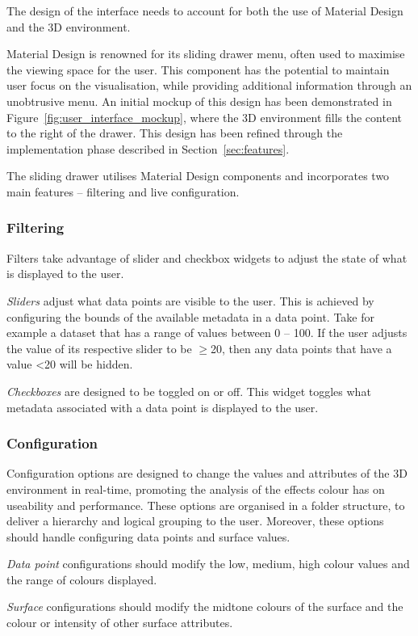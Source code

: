 {{		The design of the interface needs to account for both the use of Material Design and the 3D environment. 

		Material Design is renowned for its sliding drawer menu, often used to maximise the viewing space for the user. This component has the potential to maintain user focus on the visualisation, while providing additional information through an unobtrusive menu. An initial mockup of this design has been demonstrated in Figure~\ref{fig:user_interface_mockup}, where the 3D environment fills the content to the right of the drawer. This design has been refined through the implementation phase described in Section~\ref{sec:features}.


		

		The sliding drawer utilises Material Design components and incorporates two main features -- filtering and live configuration.

		\subsubsection{Filtering} {
		\label{sec:filtering}

			Filters take advantage of slider and checkbox widgets to adjust the state of what is displayed to the user.

			\emph{Sliders} adjust what data points are visible to the user. This is achieved by configuring the bounds of the available metadata in a data point. Take for example a dataset that has a range of values between 0 -- 100. If the user adjusts the value of its respective slider to be $\ge$20, then any data points that have a value \textless20 will be hidden.
			
			\emph{Checkboxes} are designed to be toggled on or off. This widget toggles what metadata associated with a data point is displayed to the user.

		}

		\subsubsection{Configuration} {
		\label{sec:configuration}

			Configuration options are designed to change the values and attributes of the 3D environment in real-time, promoting the analysis of the effects colour has on useability and performance. These options are organised in a folder structure, to deliver a hierarchy and logical grouping to the user. Moreover, these options should handle configuring data points and surface values.

			\emph{Data point} configurations should modify the low, medium, high colour values and the range of colours displayed.

			\emph{Surface} configurations should modify the midtone colours of the surface and the colour or intensity of other surface attributes.

		}

	}

}

